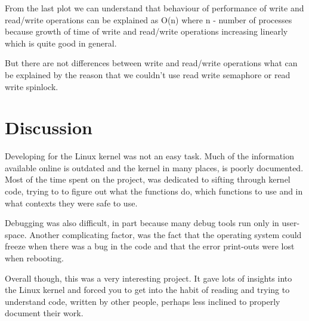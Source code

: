 \documentclass[final,a4paper]{article}
\begin{document}
From the last plot we can understand that behaviour of performance of write and
read/write operations can be explained as O(n) where n - number of processes
because growth of time of write and read/write operations increasing linearly
which is quite good in general.

But there are not differences between write and read/write operations what can
be explained by the reason that we couldn’t use read write semaphore or read
write spinlock.

\section{Discussion}
Developing for the Linux kernel was not an easy task. Much of the information
available online is outdated and the kernel in many places, is poorly
documented. Most of the time spent on the project, was dedicated to sifting
through kernel code, trying to to figure out what the functions do, which
functions to use and in what contexts they were safe to use.

Debugging was also difficult, in part because many debug tools run only in
user-space. Another complicating factor, was the fact that the operating
system could freeze when there was a bug in the code and that the error
print-outs were lost when rebooting.

Overall though, this was a very interesting project. It gave lots of insights
into the Linux kernel and forced you to get into the habit of reading and
trying to understand code, written by other people, perhaps less inclined to
properly document their work.
\end{document}
